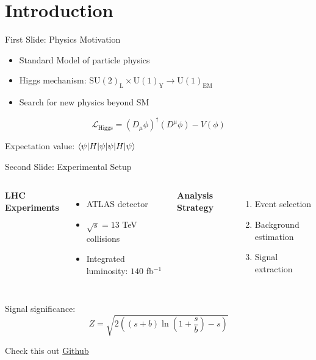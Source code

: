 \section{Introduction}

\begin{frame}{First Slide: Physics Motivation}
    \begin{itemize}
        \item Standard Model of particle physics
        \item Higgs mechanism: $\mathrm{SU(2)_L \times U(1)_Y \to U(1)_{EM}}$
        \item Search for new physics beyond SM
    \end{itemize}
    
    \begin{equation*}
        \mathcal{L}_{\text{Higgs}} = (D_\mu\phi)^\dagger(D^\mu\phi) - V(\phi)
    \end{equation*}
    
    Expectation value: $\braket{\psi | H | \psi}$
\end{frame}

\begin{frame}{Second Slide: Experimental Setup}
    \begin{columns}
        \textbf{LHC Experiments}
        \begin{itemize}
            \item \textsc{ATLAS} detector
            \item $\sqrt{s} = 13$ TeV collisions
            \item Integrated luminosity: $140$ fb$^{-1}$
        \end{itemize}
        
        \textbf{Analysis Strategy}
        \begin{enumerate}
            \item Event selection
            \item Background estimation
            \item Signal extraction
        \end{enumerate}
    \end{columns}
    
    \vspace{0.5cm}
    Signal significance: 
    \begin{equation*}
        Z = \sqrt{2\left((s+b)\ln\left(1+\frac{s}{b}\right)-s\right)}
    \end{equation*}

    \vspace{0.2cm}
    Check this out \href{https://github.com/}{Github}

\end{frame}